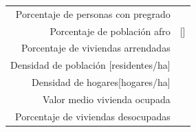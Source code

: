 \documentclass[12pt,]{book}
\begin{document}
\begin{longtable}[]{@{}rr@{}}
\begin{minipage}[t]{0.57\columnwidth}
Porcentaje de personas con pregrado\strut
\end{minipage} & \begin{minipage}[t]{0.31\columnwidth}\raggedleft\strut
\citep{cowett_methodology_2014}\strut
\end{minipage}\tabularnewline
\begin{minipage}[t]{0.57\columnwidth}\raggedleft\strut
Porcentaje de población afro\strut
\end{minipage} & \begin{minipage}[t]{0.31\columnwidth}\raggedleft\strut
{[}\citet{cowett_methodology_2014}{]}\strut
\end{minipage}\tabularnewline
\begin{minipage}[t]{0.57\columnwidth}\raggedleft\strut
Porcentaje de viviendas arrendadas\strut
\end{minipage} & \begin{minipage}[t]{0.31\columnwidth}\raggedleft\strut
\citep{heynen_political_2006}\strut
\end{minipage}\tabularnewline
\begin{minipage}[t]{0.57\columnwidth}\raggedleft\strut
Densidad de población {[}residentes/ha{]}\strut
\end{minipage} & \begin{minipage}[t]{0.31\columnwidth}\raggedleft\strut
\citep{troy_predicting_2007}\strut
\end{minipage}\tabularnewline
\begin{minipage}[t]{0.57\columnwidth}\raggedleft\strut
Densidad de hogares{[}hogares/ha{]}\strut
\end{minipage} & \begin{minipage}[t]{0.31\columnwidth}\raggedleft\strut
\citep{troy_predicting_2007}\strut
\end{minipage}\tabularnewline
\begin{minipage}[t]{0.57\columnwidth}\raggedleft\strut
Valor medio vivienda ocupada\strut
\end{minipage} & \begin{minipage}[t]{0.31\columnwidth}\raggedleft\strut
\citep{troy_predicting_2007}\strut
\end{minipage}\tabularnewline
\begin{minipage}[t]{0.57\columnwidth}\raggedleft\strut
Porcentaje de viviendas desocupadas\strut
\end{minipage} & \begin{minipage}[t]{0.31\columnwidth}\raggedleft\strut
\citep{troy_predicting_2007}\strut
\end{minipage}\tabularnewline

\end{longtable}
\end{document}

